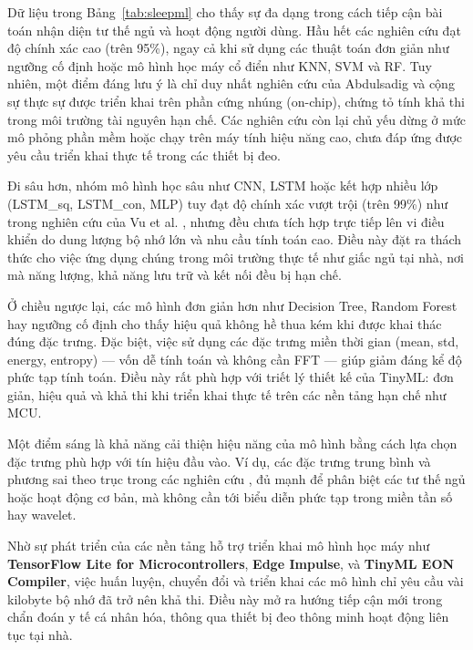 Dữ liệu trong Bảng~\ref{tab:sleepml} cho thấy sự đa dạng trong 
cách tiếp cận bài toán nhận diện tư thế ngủ và hoạt động người dùng. 
Hầu hết các nghiên cứu đạt độ chính xác cao (trên 95\%), ngay cả khi sử dụng các thuật toán đơn giản như ngưỡng cố định hoặc mô hình học máy cổ điển như KNN, SVM và RF. Tuy nhiên, một điểm đáng lưu ý là chỉ duy nhất 
nghiên cứu của Abdulsadig và cộng sự \cite{abdulsadig2023} 
thực sự được triển khai trên phần cứng nhúng (on-chip), 
chứng tỏ tính khả thi trong môi trường tài nguyên hạn chế. 
Các nghiên cứu còn lại chủ yếu dừng ở mức mô phỏng phần mềm hoặc 
chạy trên máy tính hiệu năng cao, chưa đáp ứng được yêu cầu 
triển khai thực tế trong các thiết bị đeo.

Đi sâu hơn, nhóm mô hình học sâu như CNN, LSTM hoặc kết hợp nhiều lớp 
(LSTM\_sq, LSTM\_con, MLP) tuy đạt độ chính xác vượt trội (trên 99\%) như trong nghiên cứu của Vu et al. \cite{vu2023}, nhưng đều chưa tích hợp trực tiếp lên vi điều khiển do dung lượng bộ nhớ lớn và nhu cầu tính toán cao. Điều này đặt ra thách thức cho việc ứng dụng chúng trong môi trường thực tế như giấc ngủ tại nhà, nơi mà năng lượng, khả năng lưu trữ và kết nối đều bị hạn chế.

Ở chiều ngược lại, các mô hình đơn giản hơn như Decision Tree, 
Random Forest hay ngưỡng cố định cho thấy hiệu quả không hề thua 
kém khi được khai thác đúng đặc trưng. 
Đặc biệt, việc sử dụng các đặc trưng miền thời gian 
(mean, std, energy, entropy) — vốn dễ tính toán và 
không cần FFT — giúp giảm đáng kể độ phức tạp tính toán.
Điều này rất phù hợp với triết lý thiết kế của TinyML: 
đơn giản, hiệu quả và khả thi khi triển khai thực 
tế trên các nền tảng hạn chế như MCU.

Một điểm sáng là khả năng cải thiện hiệu năng của mô hình 
bằng cách lựa chọn đặc trưng phù hợp với tín hiệu đầu vào. 
Ví dụ, các đặc trưng trung bình và phương sai theo trục trong các 
nghiên cứu \cite{gomes2021}, \cite{souza2017} đủ mạnh để phân biệt 
các tư thế ngủ hoặc hoạt động cơ bản, mà không cần tới biểu diễn 
phức tạp trong miền tần số hay wavelet.



Nhờ sự phát triển của các nền tảng hỗ trợ triển khai mô hình học máy 
như \textbf{TensorFlow Lite for Microcontrollers}, 
\textbf{Edge Impulse}, và \textbf{TinyML EON Compiler}, việc huấn luyện, chuyển đổi và triển khai các mô hình chỉ yêu cầu vài kilobyte bộ nhớ đã trở nên khả thi. Điều này mở ra hướng tiếp cận mới trong chẩn đoán y tế cá nhân hóa, thông qua thiết bị đeo thông minh hoạt động liên tục tại nhà.


